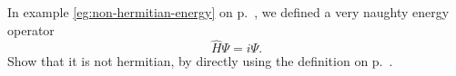 In example \ref{eg:non-hermitian-energy} on p.~\pageref{eg:non-hermitian-energy},
we defined a very naughty energy operator
\begin{equation*}
  \hat{H}\Psi = i\Psi.
\end{equation*}
Show that it is not hermitian, by directly using the definition on p.~\pageref{hermitian}.
